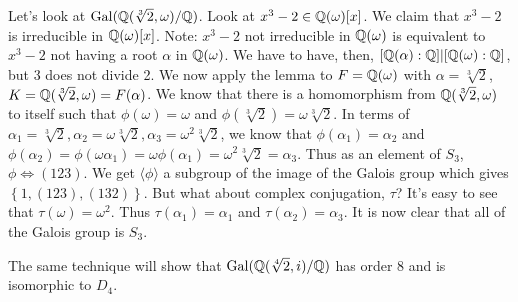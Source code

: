 \documentclass{../mathnotes}
\begin{document}
\begin{exmp}
    Let's look at $\operatorname{Gal}(\mathbb{Q}(\sqrt[3]{2},\omega)/\mathbb{Q})$. Look at $x^3-2\in\mathbb{Q}(\omega)[x]$. We claim that $x^3-2$ is irreducible in $\mathbb{Q}(\omega)[x]$.
    Note: $x^3-2$ not irreducible in $\mathbb{Q}(\omega)$ is equivalent to $x^3-2$ not having a root $\alpha$ in $\mathbb{Q}(\omega)$. We have to have, then,
    $[\mathbb{Q}(\alpha):\mathbb{Q}]|[\mathbb{Q}(\omega):\mathbb{Q}]$, but 3 does not divide 2. We now apply the lemma to $F=\mathbb{Q}(\omega)$ with $\alpha=\sqrt[3]{2}$, $K=\mathbb{Q}(\sqrt[3]{2},\omega)=F(\alpha)$.
    We know that there is a homomorphism from $\mathbb{Q}(\sqrt[3]{2},\omega)$ to itself such that $\phi(\omega)=\omega$ and $\phi(\sqrt[3]{2})=\omega\sqrt[3]{2}$.
    In terms of $\alpha_1=\sqrt[3]{2},\alpha_2=\omega\sqrt[3]{2},\alpha_3=\omega^2\sqrt[3]{2}$, we know that $\phi(\alpha_1)=\alpha_2$ and
    $\phi(\alpha_2)=\phi(\omega\alpha_1)=\omega\phi(\alpha_1)=\omega^2\sqrt[3]{2}=\alpha_3$. Thus as an element of $S_3$, $\phi\Leftrightarrow (123)$.
    We get $\langle \phi\rangle$ a subgroup of the image of the Galois group which gives $\left\{ 1,(123),(132) \right\}$. But what about complex
    conjugation, $\tau$? It's easy to see that $\tau(\omega)=\omega^2$. Thus $\tau(\alpha_1)=\alpha_1$ and $\tau(\alpha_2)=\alpha_3$.
    It is now clear that all of the Galois group is $S_3$.

    The same technique will show that $\operatorname{Gal}(\mathbb{Q}(\sqrt[4]{2},i)/\mathbb{Q})$ has order 8 and is isomorphic to $D_4$.
\end{exmp}
\end{document}
